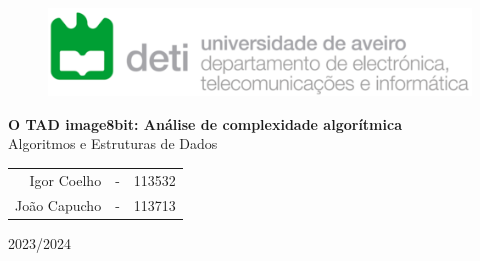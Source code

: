 \thispagestyle{empty}

\begin{figure}[H]
	\centering
	\includegraphics[width=12cm]{figs/deti.png}
\end{figure}

\vspace{4cm}

\begin{center}
	\onehalfspacing\textbf{\huge
		O TAD image8bit:
		Análise de complexidade algorítmica
	}\\
	\vspace{1cm}
	{\LARGE Algoritmos e Estruturas de Dados}

	\vspace{2cm}

	\large
	\begin{tabular}{ r c c }
		Igor Coelho   & - & 113532 \\
		João Capucho  & - & 113713 
	\end{tabular}
	\vfill
	{\Large 2023/2024}
\end{center}
